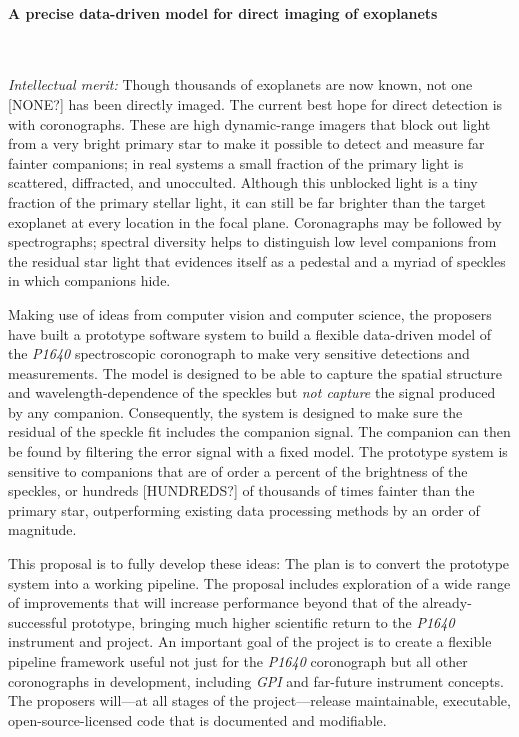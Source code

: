 \documentclass[12pt,pdftex,preprint]{aastex}
\newcommand{\project}[1]{\textsl{#1}}
\begin{document}

\paragraph{A precise data-driven model for direct imaging of exoplanets}~

\textsl{Intellectual merit:} Though thousands of exoplanets are now
known, not one [NONE?] has been directly imaged.  The current best
hope for direct detection is with coronographs.  These are high
dynamic-range imagers that block out light from a very bright primary
star to make it possible to detect and measure far fainter companions;
in real systems a small fraction of the primary light is scattered,
diffracted, and unocculted.  Although this unblocked light is a tiny
fraction of the primary stellar light, it can still be far brighter
than the target exoplanet at every location in the focal plane.
Coronagraphs may be followed by spectrographs; spectral diversity
helps to distinguish low level companions from the residual star light
that evidences itself as a pedestal and a myriad of speckles in which
companions hide.

Making use of ideas from computer vision and computer science, the
proposers have built a prototype software system to build a flexible
data-driven model of the \project{P1640} spectroscopic coronograph to
make very sensitive detections and measurements.  The model is
designed to be able to capture the spatial structure and
wavelength-dependence of the speckles but \emph{not capture} the
signal produced by any companion. Consequently, the system is designed
to make sure the residual of the speckle fit includes the companion
signal. The companion can then be found by filtering the error signal
with a fixed model.  The prototype system is sensitive to companions
that are of order a percent of the brightness of the speckles, or
hundreds [HUNDREDS?] of thousands of times fainter than the primary
star, outperforming existing data processing methods by an order of
magnitude.

This proposal is to fully develop these ideas: The plan is to convert
the prototype system into a working pipeline.  The proposal includes
exploration of a wide range of improvements that will increase
performance beyond that of the already-successful prototype, bringing
much higher scientific return to the \project{P1640} instrument and
project.  An important goal of the project is to create a flexible
pipeline framework useful not just for the \project{P1640} coronograph
but all other coronographs in development, including \project{GPI} and
far-future instrument concepts.  The proposers will---at all stages of
the project---release maintainable, executable, open-source-licensed
code that is documented and modifiable.
\end{document}

